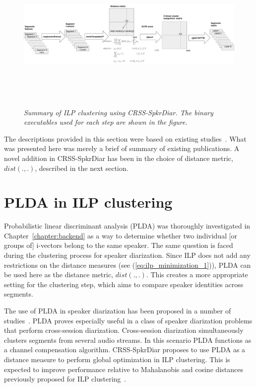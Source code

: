 \begin{figure}[ht!]
	\centering
	\includegraphics[height = 3in, width=1\textwidth]{figures/ilp_clustering_summary}
	\caption{\it \small Summary of ILP clustering using CRSS-SpkrDiar. The binary executables used for each step are shown in the figure. }
	\label{fig:ilp_clustering}
	\vspace{-3mm}
\end{figure}


The descriptions provided in this section were based on existing studies~\cite{mueller2010ILP, rouvier2012ilp,dupuy2012ivectorsILP,dupuy2014ILPimprovement}. 
What was presented here was merely a brief of summary of existing publications. 
A novel addition in CRSS-SpkrDiar has been in the choice of distance metric, $dist(.,.)$, described in the next section. 

\section{PLDA in ILP clustering}
\label{sec:plda_ilp}
Probabilistic linear discriminant analysis (PLDA) was thoroughly investigated in Chapter~\ref{chapter:backend} as a way to determine whether two individual [or groups of] i-vectors belong to the same speaker. 
The same question is faced during the clustering process for speaker diarization. 
Since ILP does not add any restrictions on the distance measures (see (\ref{eq:ilp_minimization_1})), PLDA can be used here as the distance metric, $dist(.,.)$. 
This creates a more appropriate setting for the clustering step, which aims to compare speaker identities across segments. 

The use of PLDA in speaker diarization has been proposed in a number of studies~\cite{prazak2011PLDAdrz, silovsky2011PLDAdrz, sell2014PLDAdrz}. 
PLDA proves especially useful in a class of speaker diarization problems that perform cross-session diarization. 
Cross-session diarization simultaneously clusters segments from several audio streams. 
In this scenario PLDA functions as a channel compensation algorithm. 
CRSS-SpkrDiar proposes to use PLDA as a distance measure to perform global optimization in ILP clustering. 
This is expected to improve performance relative to Mahalanobis and cosine distances previously proposed for ILP clustering~\cite{dupuy2012ivectorsILP,dupuy2014ILPimprovement}. 

